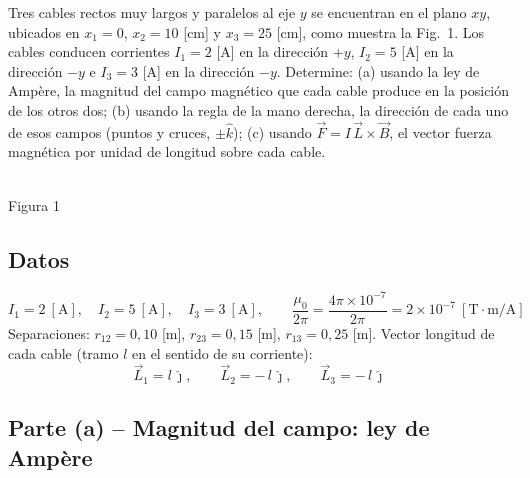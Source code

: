 \documentclass[12pt,letterpaper]{article}
\newcommand{\ejesxyz}[1]{%
  \begin{scope}[shift={(#1)}]
    \draw[->,line width=0.7pt] (0,0)--(0.75,0) node[right,font=\footnotesize]{$x$};
    \draw[->,line width=0.7pt] (0,0)--(0,0.75) node[above,font=\footnotesize]{$y$};
    \draw[line width=0.6pt,fill=white] (0,0) circle (0.1); \fill (0,0) circle (0.03);
    \node[below left=-1pt,font=\footnotesize] at (0,0){$z$};
  \end{scope}}
\begin{document}
Tres cables rectos muy largos y paralelos al eje $y$ se encuentran en el plano $xy$, ubicados en
$x_1 = 0$, $x_2 = 10$ [cm] y $x_3 = 25$ [cm], como muestra la Fig.\ 1. Los cables conducen corrientes
$I_1 = 2$ [A] en la direcci\'on $+y$, $I_2 = 5$ [A] en la direcci\'on $-y$ e $I_3 = 3$ [A] en la
direcci\'on $-y$. Determine: (a) usando la ley de Amp\`ere, la magnitud del campo magn\'etico que cada
cable produce en la posici\'on de los otros dos; (b) usando la regla de la mano derecha, la
direcci\'on de cada uno de esos campos (puntos y cruces, $\pm\hat{k}$); (c) usando
$\vec{F} = I\,\vec{L}\times\vec{B}$, el vector fuerza magn\'etica por unidad de longitud sobre cada
cable.

\begin{center}
\\[2pt]
{\footnotesize Figura 1}
\end{center}

\subsection*{Datos}
\[
    I_1 = 2\ [\text{A}],\quad I_2 = 5\ [\text{A}],\quad I_3 = 3\ [\text{A}],\qquad
    \frac{\mu_0}{2\pi} = \frac{4\pi\times10^{-7}}{2\pi} = 2\times10^{-7}\ [\text{T}\cdot\text{m/A}]
\]
Separaciones: $r_{12} = 0{,}10$ [m], $r_{23} = 0{,}15$ [m], $r_{13} = 0{,}25$ [m]. Vector longitud de
cada cable (tramo $l$ en el sentido de su corriente):
\[
    \vec{L}_1 = l\,\hat{\jmath},\qquad \vec{L}_2 = -\,l\,\hat{\jmath},\qquad \vec{L}_3 = -\,l\,\hat{\jmath}
\]

\subsection*{Parte (a) -- Magnitud del campo: ley de Amp\`ere}
\end{document}
